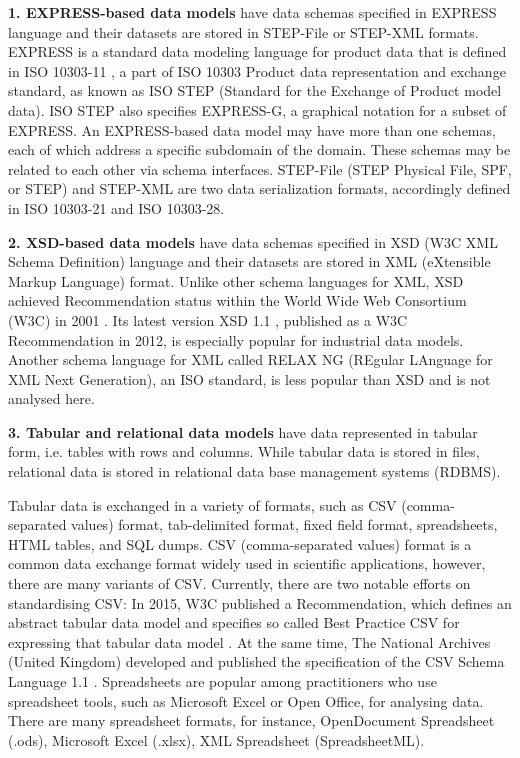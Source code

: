 \textbf{1. EX\-PRESS-ba\-sed da\-ta mod\-els} have data schemas specified in EXPRESS language \cite{iso2004express} and their datasets are stored in STEP-File or STEP-XML formats.
EXPRESS is a standard data modeling language for product data that is defined in ISO 10303-11 \cite{iso2004express}, a part of ISO 10303 Product data representation and exchange standard, as known as ISO STEP (Standard for the Exchange of Product model data).
ISO STEP also specifies EXPRESS-G, a graphical notation for a subset of EXPRESS.
An EXPRESS-based data model may have more than one schemas, each of which address a specific subdomain of the domain.
These schemas may be related to each other via schema interfaces.
STEP-File (STEP Physical File, SPF, or STEP) \cite{iso2016stepfile} and STEP-XML \cite{iso2007stepxml} are two data serialization formats, accordingly defined in ISO 10303-21 and ISO 10303-28.




\textbf{2. XSD-\-ba\-sed da\-ta mod\-els} have data schemas specified in XSD (W3C XML Schema Definition) language and their datasets are stored in XML (eXtensible Markup Language) format.
Unlike other schema languages for XML, XSD achieved Recommendation status within the World Wide Web Consortium (W3C) in 2001 .
Its latest version XSD 1.1 \cite{gao2009w3c, peterson2009w3c}, published as a W3C Recommendation in 2012, is especially popular for industrial data models.
Another schema language for XML called RELAX NG (REgular LAnguage for XML Next Generation), an ISO standard, is less popular than XSD and is not analysed here.




\textbf{3. Tabular and relational data models} have data represented in tabular form, i.e. tables with rows and columns.
While tabular data is stored in files, relational data is stored in relational data base management systems (RDBMS).

Tabular data is exchanged in a variety of formats, such as CSV (comma-separated values) format, tab-delimited format, fixed field format, spreadsheets, HTML tables, and SQL dumps.
CSV (comma-separated values) format is a common data exchange format widely used in scientific applications, however, there are many variants of CSV.
Currently, there are two notable efforts on standardising CSV:
In 2015, W3C published a Recommendation, which defines an abstract tabular data model and specifies so called Best Practice CSV for expressing that tabular data model \cite{tennison2015tabular}.
At the same time, The National Archives (United Kingdom) developed and published the specification of the CSV Schema Language 1.1 \cite{retter2016csv}.  
Spreadsheets are popular among practitioners who use spreadsheet tools, such as Microsoft Excel or Open Office, for analysing data.
There are many spreadsheet formats, for instance, OpenDocument Spreadsheet (.ods), Microsoft Excel (.xlsx), XML Spreadsheet (SpreadsheetML).


